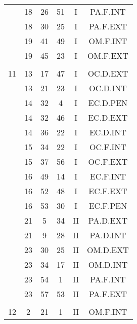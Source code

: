 \documentclass[12pt, a4paper]{article}
\begin{document}
\begin{multicols}{3}
{\begin{tabular}{c c c c c c}
	 	 	 	 & 18 & 26 & 51 & I & PA.F.INT\\%
	 	 	 	 & 18 & 30 & 25 & I & PA.F.EXT\\%
	 	 	 	 & 19 & 41 & 49 & I & OM.F.INT\\%
	 	 	 	 & 19 & 45 & 23 & I & OM.F.EXT\\%
	 	 	 	 & & & & & \\%
	 	 	 	11 & 13 & 17 & 47 & I & OC.D.EXT\\%
	 	 	 	 & 13 & 21 & 23 & I & OC.D.INT\\%
	 	 	 	 & 14 & 32 & 4 & I & EC.D.PEN\\%
	 	 	 	 & 14 & 32 & 46 & I & EC.D.EXT\\%
	 	 	 	 & 14 & 36 & 22 & I & EC.D.INT\\%
	 	 	 	 & 15 & 34 & 22 & I & OC.F.INT\\%
	 	 	 	 & 15 & 37 & 56 & I & OC.F.EXT\\%
	 	 	 	 & 16 & 49 & 14 & I & EC.F.INT\\%
	 	 	 	 & 16 & 52 & 48 & I & EC.F.EXT\\%
	 	 	 	 & 16 & 53 & 30 & I & EC.F.PEN\\%
	 	 	 	 & 21 & 5 & 34 & II & PA.D.EXT\\%
	 	 	 	 & 21 & 9 & 28 & II & PA.D.INT\\%
	 	 	 	 & 23 & 30 & 25 & II & OM.D.EXT\\%
	 	 	 	 & 23 & 34 & 17 & II & OM.D.INT\\%
	 	 	 	 & 23 & 54 & 1 & II & PA.F.INT\\%
	 	 	 	 & 23 & 57 & 53 & II & PA.F.EXT\\%
	 	 	 	 & & & & & \\%
	 	 	 	12 & 2 & 21 & 1 & II & OM.F.INT\\%
	 	 \end{tabular}
 	}
\end{multicols}
\end{document}
